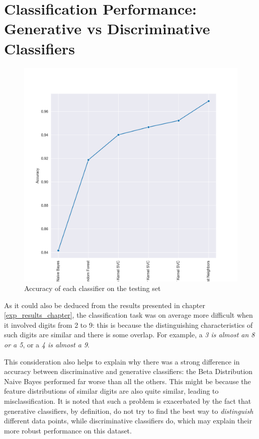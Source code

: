 \begin{figure}[h]
\begin{minipage}{0.475\textwidth}
        \label{fig:exp_res_pred_time_all}
    \end{minipage}
\end{figure}

\begin{figure}[h]
\end{figure}

\break
\section{Classification Performance: Generative vs Discriminative Classifiers}

\begin{figure}[h]
    \centering
    \includegraphics[scale=0.6]{images/exp-results/test_accuracy.png}
    \caption{Accuracy of each classifier on the testing set}
    \label{fig:exp_res_test_accuracy_all}
\end{figure}


As it could also be deduced from the results presented in chapter \ref{exp_results_chapter}, the classification task was on average more difficult when it involved digits from 2 to 9: this is because the distinguishing characteristics of such digits are similar and there is some overlap. For example, a \textit{3 is almost an 8 or a 5}, or a \textit{4 is almost a 9}.

This consideration also helps to explain why there was a strong difference in accuracy between discriminative and generative classifiers: the Beta Distribution Naive Bayes performed far worse than all the others. This might be because the feature distributions of similar digits are also quite similar, leading to misclassification. 
It is noted that such a problem is exacerbated by the fact that generative classifiers, by definition, do not try to find the best way to \textit{distinguish} different data points, while discriminative classifiers do, which may explain their more robust performance on this dataset.